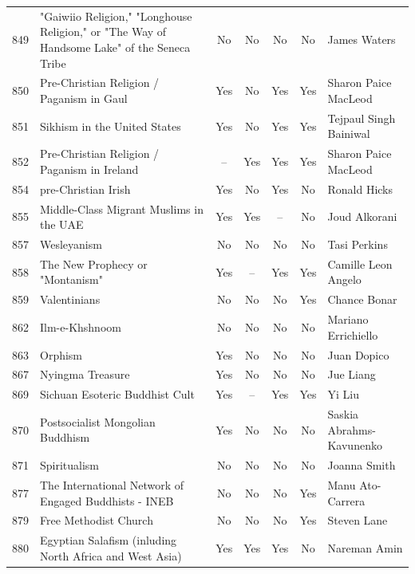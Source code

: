 {\begin{longtable}{rp{3.5cm}ccccp{3cm}}
849 & {\raggedright "Gaiwiio Religion," "Longhouse Religion," or "The Way of Handsome Lake" of the Seneca Tribe} & No & No & No & No & {\raggedright James Waters} \\
850 & {\raggedright Pre-Christian Religion / Paganism in Gaul} & Yes & No & Yes & Yes & {\raggedright Sharon Paice MacLeod} \\
851 & {\raggedright Sikhism in the United States} & Yes & No & Yes & Yes & {\raggedright Tejpaul Singh Bainiwal} \\
852 & {\raggedright Pre-Christian Religion / Paganism in Ireland} & -- & Yes & Yes & Yes & {\raggedright Sharon Paice MacLeod} \\
854 & {\raggedright pre-Christian Irish} & Yes & No & Yes & No & {\raggedright Ronald Hicks} \\
855 & {\raggedright Middle-Class Migrant Muslims in the UAE} & Yes & Yes & -- & No & {\raggedright Joud Alkorani} \\
857 & {\raggedright Wesleyanism} & No & No & No & No & {\raggedright Tasi Perkins} \\
858 & {\raggedright The New Prophecy or "Montanism"} & Yes & -- & Yes & Yes & {\raggedright Camille Leon Angelo} \\
859 & {\raggedright Valentinians} & No & No & No & Yes & {\raggedright Chance Bonar} \\
862 & {\raggedright Ilm-e-Khshnoom} & No & No & No & No & {\raggedright Mariano Errichiello} \\
863 & {\raggedright Orphism} & Yes & No & No & No & {\raggedright Juan Dopico} \\
867 & {\raggedright Nyingma Treasure} & Yes & No & No & No & {\raggedright Jue Liang} \\
869 & {\raggedright Sichuan Esoteric Buddhist Cult} & Yes & -- & Yes & Yes & {\raggedright Yi Liu} \\
870 & {\raggedright Postsocialist Mongolian Buddhism} & Yes & No & No & No & {\raggedright Saskia Abrahms-Kavunenko} \\
871 & {\raggedright Spiritualism} & No & No & No & No & {\raggedright Joanna Smith} \\
877 & {\raggedright The International Network of Engaged Buddhists - INEB} & No & No & No & Yes & {\raggedright Manu Ato-Carrera} \\
879 & {\raggedright Free Methodist Church} & No & No & No & Yes & {\raggedright Steven Lane} \\
880 & {\raggedright Egyptian Salafism (inluding North Africa and West Asia)} & Yes & Yes & Yes & No & {\raggedright Nareman Amin} \\

\end{longtable}}
